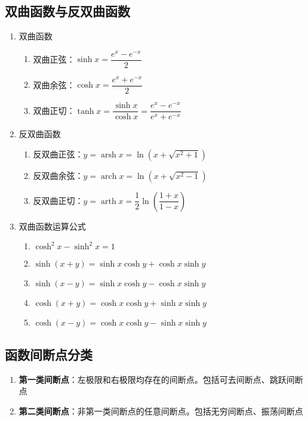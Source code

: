 \documentclass[12pt,a4paper,UTF8]{book}
\begin{document}
\subsection{双曲函数与反双曲函数}
\begin{enumerate}
\item 双曲函数
\begin{enumerate}
\item 双曲正弦：$\sinh x=\dfrac{e^x-e^{-x}}{2}$
\item 双曲余弦：$\cosh x=\dfrac{e^x+e^{-x}}{2}$
\item 双曲正切：$\tanh x=\dfrac{\sinh x}{\cosh x}=\dfrac{e^x-e^{-x}}{e^x+e^{-x}}$
\end{enumerate}
\item 反双曲函数
\begin{enumerate}
\item 反双曲正弦：$y=\operatorname{arsh}x=\ln\left(x+\sqrt{x^2+1}\right)$
\item 反双曲余弦：$y=\operatorname{arch}x=\ln\left(x+\sqrt{x^2-1}\right)$
\item 反双曲正切：$y=\operatorname{arth}x=\dfrac{1}{2}\ln\left(\dfrac{1+x}{1-x}\right)$
\end{enumerate}
\item 双曲函数运算公式
\begin{enumerate}
\item $\cosh^2x-\sinh^2x=1$
\item $\sinh\left(x+y\right)=\sinh x\cosh y+\cosh x\sinh y$
\item $\sinh\left(x-y\right)=\sinh x\cosh y-\cosh x\sinh y$
\item $\cosh\left(x+y\right)=\cosh x\cosh y+\sinh x\sinh y$
\item $\cosh\left(x-y\right)=\cosh x\cosh y-\sinh x\sinh y$
\end{enumerate}
\end{enumerate}

\subsection{函数间断点分类}
\begin{enumerate}
\item \textbf{第一类间断点}：左极限和右极限均存在的间断点。包括可去间断点、跳跃间断点
\item \textbf{第二类间断点}：非第一类间断点的任意间断点。包括无穷间断点、振荡间断点
\end{enumerate}
\end{document}
